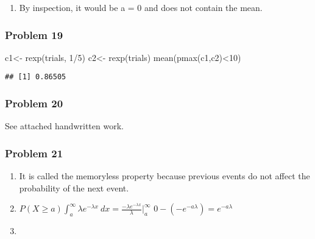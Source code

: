 \documentclass[
]{article}
\newenvironment{Shaded}{\begin{snugshade}}{\end{snugshade}}
\newcommand{\DecValTok}[1]{\textcolor[rgb]{0.00,0.00,0.81}{#1}}
\newcommand{\FunctionTok}[1]{\textcolor[rgb]{0.00,0.00,0.00}{#1}}
\newcommand{\NormalTok}[1]{#1}
\newcommand{\OtherTok}[1]{\textcolor[rgb]{0.56,0.35,0.01}{#1}}
\newcommand{\SpecialCharTok}[1]{\textcolor[rgb]{0.00,0.00,0.00}{#1}}
\providecommand{\tightlist}{%
  \setlength{\itemsep}{0pt}\setlength{\parskip}{0pt}}
\begin{document}
\begin{enumerate}
\def\labelenumi{\alph{enumi}.}
\setcounter{enumi}{1}
\tightlist
\item
  By inspection, it would be a = 0 and does not contain the mean.
\end{enumerate}

\hypertarget{problem-19}{%
\subsubsection{Problem 19}\label{problem-19}}

\begin{Shaded}
\begin{Highlighting}[]
\NormalTok{c1}\OtherTok{\textless{}{-}} \FunctionTok{rexp}\NormalTok{(trials, }\DecValTok{1}\SpecialCharTok{/}\DecValTok{5}\NormalTok{)}
\NormalTok{c2}\OtherTok{\textless{}{-}} \FunctionTok{rexp}\NormalTok{(trials)}
\FunctionTok{mean}\NormalTok{(}\FunctionTok{pmax}\NormalTok{(c1,c2)}\SpecialCharTok{\textless{}}\DecValTok{10}\NormalTok{)}
\end{Highlighting}
\end{Shaded}

\begin{verbatim}
## [1] 0.86505
\end{verbatim}

\hypertarget{problem-20}{%
\subsubsection{Problem 20}\label{problem-20}}

See attached handwritten work.

\hypertarget{problem-21}{%
\subsubsection{Problem 21}\label{problem-21}}

\begin{enumerate}
\def\labelenumi{\alph{enumi}.}
\tightlist
\item
  It is called the memoryless property because previous events do not
  affect the probability of the next event.
\item
  \(P(X\geq a)\int_a^\infty \lambda e^{-\lambda x}\ dx = \frac{-\lambda e^{-\lambda x}}{\lambda}|_a^\infty\)
  \(0 - (-e^{-a\lambda}) = e^{-a\lambda}\)
\item
\end{enumerate}
\end{document}
